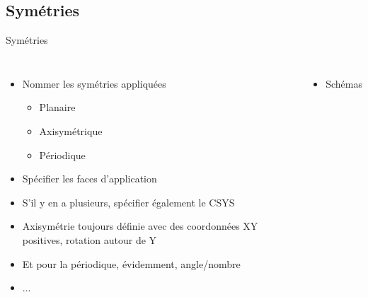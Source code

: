 \subsection{Symétries}
\label{sec:Symétries}

\begin{frame}[c]{Symétries}
  \begin{columns}
        \begin{itemize}
            \item Nommer les symétries appliquées
            \begin{itemize}
                \item Planaire
                \item Axisymétrique
                \item Périodique
            \end{itemize}
            \item Spécifier les faces d'application
            \item S'il y en a plusieurs, spécifier également le CSYS 
            \item Axisymétrie toujours définie avec des coordonnées XY positives, rotation autour de Y
            \item Et pour la périodique, évidemment, angle/nombre
            \item ...
        \end{itemize}
    \begin{itemize}
        \item Schémas
    \end{itemize}
  \end{columns}
\end{frame}